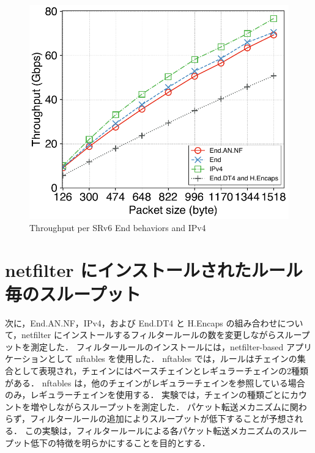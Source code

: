 \begin{figure}[t]
    \centering
    \includegraphics[width=0.95\linewidth]{img/size-throughput.pdf}
    \caption{Throughput per SRv6 End behaviors and IPv4}
    \label{fig:size-thru}
\end{figure}


\section{netfilter にインストールされたルール毎のスループット}
\label{sec:eval.thru-chains}
次に，End.AN.NF，IPv4，および End.DT4 と H.Encaps の組み合わせについて，netfilter にインストールするフィルタールールの数を変更しながらスループットを測定した．
フィルタールールのインストールには，netfilter-based アプリケーションとして nftables を使用した．
nftables では，ルールはチェインの集合として表現され，チェインにはベースチェインとレギュラーチェインの2種類がある．
nftables は，他のチェインがレギュラーチェインを参照している場合のみ，レギュラーチェインを使用する．
実験では，チェインの種類ごとにカウントを増やしながらスループットを測定した．
パケット転送メカニズムに関わらず，フィルタールールの追加によりスループットが低下することが予想される．
この実験は，フィルタールールによる各パケット転送メカニズムのスループット低下の特徴を明らかにすることを目的とする．

